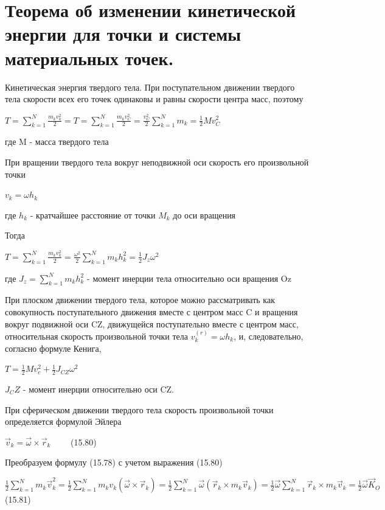{\section{Теорема об изменении кинетической энергии для точки и системы материальных точек.}
\begin{center}
    \par Кинетическая энергия твердого тела. При поступательном движении твердого тела скорости всех его точек одинаковы и равны скорости центра масс, поэтому
    \par $T= \sum_{k=1}^{N} {\frac{m_k v_k^2}{2}} = T= \sum_{k=1}^{N}{\frac{m_k v_C^2}{2}} = \frac{v_C^2}{2} \sum_{k=1}^{N} {m_k} = \frac{1}{2} M v_C^2 $
    \par где M - масса твердого тела 
    \par При  вращении  твердого  тела  вокруг  неподвижной  оси  скорость его произвольной точки
    \par $ v_k = \omega h_k$
    \par где $ h_k$ - кратчайшее расстояние от точки $M_k$ до оси вращения 
    \par Тогда 
    \par $T= \sum_{k=1}^{N} {\frac{m_k v_k^2}{2}} = \frac{\omega^2}{2} \sum_{k=1}^{N} {m_k h_k^2} = \frac{1}{2} J_z \omega^2  $
    \par где $J_z = \sum_{k=1}^{N} {m_k h_k^2}$ - момент инерции тела относительно оси вращения Oz 
    \par При плоском движении твердого тела, которое можно рассматривать как совокупность поступательного движения вместе с центром масс C и вращения  вокруг  подвижной  оси  CZ,  движущейся  поступательно  вместе  с центром масс, относительная скорость произвольной точки тела $ v_k^{(r)} = \omega h_k$, и, следовательно, согласно формуле Кенига,
    \par $T = \frac{1}{2} M v_c^2 + \frac{1}{2} J_{CZ} \omega^2 $
    \par $J_CZ$ - момент инерции относительно оси CZ.
    \par При  сферическом  движении  твердого  тела скорость произвольной точки определяется формулой Эйлера
    \par $\Vec{v}_k = \vec{\omega} \times {\vec{r}_k} \qquad$ (15.80)
    \par Преобразуем формулу (15.78) с учетом выражения (15.80)
    \par $ \frac{1}{2} \sum_{k=1}^N {m_k \vec {v}_k^2} = \frac{1}{2} \sum_{k=1}^N {m_k v_k (\vec{\omega} \times {\vec{r}_k})} =\frac{1}{2} \sum_{k=1}^N {\vec{\omega} (\vec{r}_k \times m_k \vec{v}_k)} = \frac{1}{2} \vec{\omega} \sum_{k=1}^N {\vec{r}_k \times m_k \vec{v}_k} = \frac{1}{2} \vec{\omega} \vec{K}_O \qquad$ (15.81)

\end{center}}
